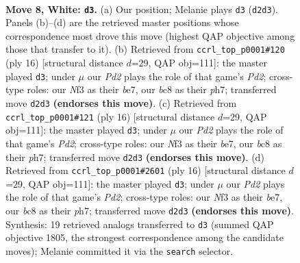 \documentclass[11pt]{article}
\begin{document}
\begin{figure}[p]\centering
\begin{subfigure}{0.46\textwidth}\centering
\resizebox{\linewidth}{!}{%
\newchessgame
\chessboard[
  setfen={r1bqkb1r/ppp2pp1/1nn5/4p2p/8/2N2NP1/PP1PPPBP/R1BQ1RK1 w kq - 0 8},
  showmover=false,
  pgfstyle=straightmove, color=movearrow, markmove={d2-d3}
]}
\caption{}
\end{subfigure}\hfill
\begin{subfigure}{0.46\textwidth}\centering
\resizebox{\linewidth}{!}{%
\newchessgame
\chessboard[
  setfen={r1bqk2r/ppp1bp1p/1nn5/4p1p1/8/P1N2NP1/1P1PPPBP/R1BQ1RK1 w kq - 0 9},
  showmover=false,
  pgfstyle=straightmove, color=movearrow, markmove={d2-d3}
]}
\caption{}
\end{subfigure}
\\[4pt]
\begin{subfigure}{0.46\textwidth}\centering
\resizebox{\linewidth}{!}{%
\newchessgame
\chessboard[
  setfen={r1bqk2r/ppp1bp1p/1nn5/4p1p1/8/P1N2NP1/1P1PPPBP/R1BQ1RK1 w kq - 0 9},
  showmover=false,
  pgfstyle=straightmove, color=movearrow, markmove={d2-d3}
]}
\caption{}
\end{subfigure}\hfill
\begin{subfigure}{0.46\textwidth}\centering
\resizebox{\linewidth}{!}{%
\newchessgame
\chessboard[
  setfen={r1bqk2r/ppp1bp1p/1nn5/4p1p1/8/P1N2NP1/1P1PPPBP/R1BQ1RK1 w kq - 0 9},
  showmover=false,
  pgfstyle=straightmove, color=movearrow, markmove={d2-d3}
]}
\caption{}
\end{subfigure}
\caption{\textbf{Move 8, White: \texttt{d3}.} (a) Our position; Melanie plays \texttt{d3} (\texttt{d2d3}). Panels (b)--(d) are the retrieved master positions whose correspondence most drove this move (highest QAP objective among those that transfer to it). (b) Retrieved from \texttt{ccrl\_top\_p0001\#120} (ply 16) [structural distance $d$=29, QAP obj=111]: the master played \texttt{d3}; under $\mu$ our \emph{Pd2} plays the role of that game's \emph{Pd2}; cross-type roles: our \emph{N}f3 as their \emph{b}e7, our \emph{b}c8 as their \emph{p}h7; transferred move \texttt{d2d3} \textbf{(endorses this move)}. (c) Retrieved from \texttt{ccrl\_top\_p0001\#121} (ply 16) [structural distance $d$=29, QAP obj=111]: the master played \texttt{d3}; under $\mu$ our \emph{Pd2} plays the role of that game's \emph{Pd2}; cross-type roles: our \emph{N}f3 as their \emph{b}e7, our \emph{b}c8 as their \emph{p}h7; transferred move \texttt{d2d3} \textbf{(endorses this move)}. (d) Retrieved from \texttt{ccrl\_top\_p0001\#2601} (ply 16) [structural distance $d$=29, QAP obj=111]: the master played \texttt{d3}; under $\mu$ our \emph{Pd2} plays the role of that game's \emph{Pd2}; cross-type roles: our \emph{N}f3 as their \emph{b}e7, our \emph{b}c8 as their \emph{p}h7; transferred move \texttt{d2d3} \textbf{(endorses this move)}. Synthesis: 19 retrieved analogs transferred to \texttt{d3} (summed QAP objective 1805, the strongest correspondence among the candidate moves); Melanie committed it via the \texttt{search} selector.}
\label{fig:thought-m14}
\end{figure}
\end{document}

